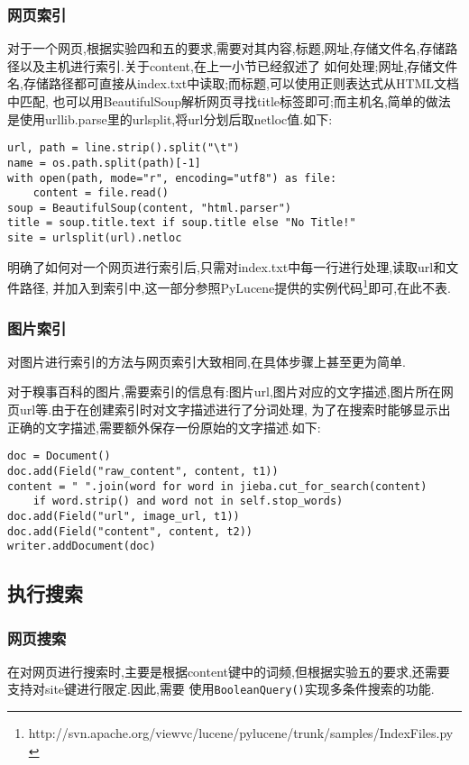 \documentclass[a4paper]{article}
\begin{document}
        \subsubsection{网页索引}
对于一个网页,根据实验四和五的要求,需要对其内容,标题,网址,存储文件名,存储路径以及主机进行索引.关于content,在上一小节已经叙述了
如何处理;网址,存储文件名,存储路径都可直接从index.txt中读取;而标题,可以使用正则表达式从HTML文档中匹配,
也可以用BeautifulSoup解析网页寻找title标签即可;而主机名,简单的做法是使用urllib.parse里的urlsplit,将url分划后取netloc值.如下:
\begin{verbatim}
url, path = line.strip().split("\t")
name = os.path.split(path)[-1]
with open(path, mode="r", encoding="utf8") as file:
    content = file.read()
soup = BeautifulSoup(content, "html.parser")
title = soup.title.text if soup.title else "No Title!"
site = urlsplit(url).netloc
\end{verbatim}

明确了如何对一个网页进行索引后,只需对index.txt中每一行进行处理,读取url和文件路径,
并加入到索引中,这一部分参照PyLucene提供的实例代码\footnote{http://svn.apache.org/viewvc/lucene/pylucene/trunk/samples/IndexFiles.py}即可,在此不表.
    \subsubsection{图片索引}
对图片进行索引的方法与网页索引大致相同,在具体步骤上甚至更为简单. 

对于糗事百科的图片,需要索引的信息有:图片url,图片对应的文字描述,图片所在网页url等.由于在创建索引时对文字描述进行了分词处理,
为了在搜索时能够显示出正确的文字描述,需要额外保存一份原始的文字描述.如下:

\begin{verbatim}
doc = Document()
doc.add(Field("raw_content", content, t1))
content = " ".join(word for word in jieba.cut_for_search(content)
    if word.strip() and word not in self.stop_words)
doc.add(Field("url", image_url, t1))
doc.add(Field("content", content, t2))
writer.addDocument(doc)
\end{verbatim}
    \subsection{执行搜索}
        \subsubsection{网页搜索}
在对网页进行搜索时,主要是根据content键中的词频,但根据实验五的要求,还需要支持对site键进行限定.因此,需要
使用\texttt{BooleanQuery()}实现多条件搜索的功能.
\end{document}
